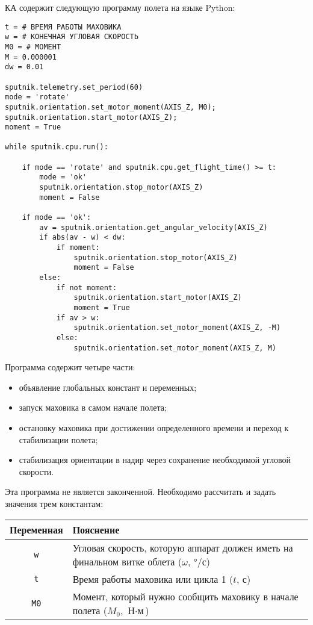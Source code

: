 \documentclass[12pt,a4paper]{article}
\begin{document}
КА содержит следующую программу полета на языке Python:

\begin{verbatim}
t = # ВРЕМЯ РАБОТЫ МАХОВИКА
w = # КОНЕЧНАЯ УГЛОВАЯ СКОРОСТЬ
M0 = # МОМЕНТ
M = 0.000001
dw = 0.01

sputnik.telemetry.set_period(60)
mode = 'rotate'
sputnik.orientation.set_motor_moment(AXIS_Z, M0);
sputnik.orientation.start_motor(AXIS_Z);
moment = True

while sputnik.cpu.run():

    if mode == 'rotate' and sputnik.cpu.get_flight_time() >= t: 
        mode = 'ok'
        sputnik.orientation.stop_motor(AXIS_Z)
        moment = False

    if mode == 'ok':
        av = sputnik.orientation.get_angular_velocity(AXIS_Z)
        if abs(av - w) < dw:
            if moment:
                sputnik.orientation.stop_motor(AXIS_Z)
                moment = False
        else:
            if not moment:
                sputnik.orientation.start_motor(AXIS_Z)
                moment = True
            if av > w:
                sputnik.orientation.set_motor_moment(AXIS_Z, -M)
            else:
                sputnik.orientation.set_motor_moment(AXIS_Z, M)
\end{verbatim}

Программа содержит четыре части:

\begin{itemize}
\item объявление глобальных констант и переменных;
\item запуск маховика в самом начале полета;
\item остановку маховика при достижении определенного времени и переход к стабилизации полета;
\item стабилизация ориентации в надир через сохранение необходимой угловой скорости.
\end{itemize}
  
Эта программа не является законченной. Необходимо рассчитать и задать значения трем
константам:

\begin{center}
\begin{tabular}{ |c|p{12cm}|} 
  \hline
  \textbf{Переменная} & \textbf{Пояснение} \\
  \hline
  \verb'w' & Угловая скорость, которую аппарат должен иметь на финальном витке облета
  ($\omega$, °/с)\\
  \hline
  \verb't' & Время работы маховика или цикла 1 ($t$, с)\\
  \hline
  \verb'M0' & Момент, который нужно сообщить маховику в начале полета ($M_0$, $\text{Н}
  \cdot \text{м}$)\\
  \hline
\end{tabular}
\end{center}
\end{document}

